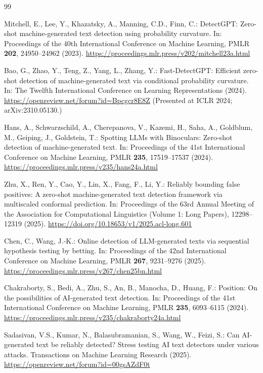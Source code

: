 \documentclass[pdflatex,sn-mathphys-num]{sn-jnl}
\begin{document}
\begin{thebibliography}{99}

Mitchell, E., Lee, Y., Khazatsky, A., Manning, C.D., Finn, C.:
DetectGPT: Zero-shot machine-generated text detection using probability curvature.
In: Proceedings of the 40th International Conference on Machine Learning, PMLR \textbf{202}, 24950--24962 (2023).
\url{https://proceedings.mlr.press/v202/mitchell23a.html}

Bao, G., Zhao, Y., Teng, Z., Yang, L., Zhang, Y.:
Fast-DetectGPT: Efficient zero-shot detection of machine-generated text via conditional probability curvature.
In: The Twelfth International Conference on Learning Representations (2024).
\url{https://openreview.net/forum?id=Bpcgcr8E8Z}
(Presented at ICLR 2024; arXiv:2310.05130.)

Hans, A., Schwarzschild, A., Cherepanova, V., Kazemi, H., Saha, A., Goldblum, M., Geiping, J., Goldstein, T.:
Spotting LLMs with Binoculars: Zero-shot detection of machine-generated text.
In: Proceedings of the 41st International Conference on Machine Learning, PMLR \textbf{235}, 17519--17537 (2024).
\url{https://proceedings.mlr.press/v235/hans24a.html}

Zhu, X., Ren, Y., Cao, Y., Lin, X., Fang, F., Li, Y.:
Reliably bounding false positives: A zero-shot machine-generated text detection framework via multiscaled conformal prediction.
In: Proceedings of the 63rd Annual Meeting of the Association for Computational Linguistics (Volume 1: Long Papers), 12298--12319 (2025).
\url{https://doi.org/10.18653/v1/2025.acl-long.601}

Chen, C., Wang, J.-K.:
Online detection of LLM-generated texts via sequential hypothesis testing by betting.
In: Proceedings of the 42nd International Conference on Machine Learning, PMLR \textbf{267}, 9231--9276 (2025).
\url{https://proceedings.mlr.press/v267/chen25bn.html}

Chakraborty, S., Bedi, A., Zhu, S., An, B., Manocha, D., Huang, F.:
Position: On the possibilities of AI-generated text detection.
In: Proceedings of the 41st International Conference on Machine Learning, PMLR \textbf{235}, 6093--6115 (2024).
\url{https://proceedings.mlr.press/v235/chakraborty24a.html}

Sadasivan, V.S., Kumar, N., Balasubramanian, S., Wang, W., Feizi, S.:
Can AI-generated text be reliably detected? Stress testing AI text detectors under various attacks.
Transactions on Machine Learning Research (2025).
\url{https://openreview.net/forum?id=00gsAZdF0t}


\end{thebibliography}
\end{document}
